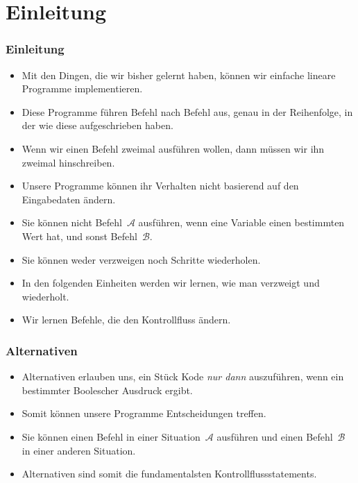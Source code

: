 \documentclass[aspectratio=169,mathserif,notheorems]{beamer}%
\subtitle{22.~Alternativen~mit~if}%
\begin{document}
%
%
\startPresentation%
%
\section{Einleitung}%
\begin{frame}[t]%
\frametitle{Einleitung}%
%
\begin{itemize}%
\item Mit den Dingen, die wir bisher gelernt haben, können wir einfache lineare Programme implementieren.%
\item<2-> Diese Programme führen Befehl nach Befehl aus, genau in der Reihenfolge, in der wie diese aufgeschrieben haben.%
\item<3-> Wenn wir einen Befehl zweimal ausführen wollen, dann müssen wir ihn zweimal hinschreiben.%
\item<4-> Unsere Programme können ihr Verhalten nicht basierend auf den Eingabedaten ändern.%
\item<5-> Sie können nicht Befehl~$\mathcal{A}$ ausführen, wenn eine Variable einen bestimmten Wert hat, und sonst Befehl~$\mathcal{B}$.%
\item<6-> Sie können weder verzweigen noch Schritte wiederholen.%
\item<7-> In den folgenden Einheiten werden wir lernen, wie man verzweigt und wiederholt.%
\item<8-> Wir lernen Befehle, die den Kontrollfluss ändern.%
%
\end{itemize}%
\end{frame}%
%
\begin{frame}%
\frametitle{Alternativen}%
\begin{itemize}%
\item Alternativen erlauben uns, ein Stück Kode \emph{nur dann} auszuführen, wenn ein bestimmter Boolescher Ausdruck  ergibt.%
%
\item<2-> Somit können unsere Programme Entscheidungen treffen.%
%
\item<3-> Sie können einen Befehl in einer Situation~$\mathcal{A}$ ausführen und einen Befehl~$\mathcal{B}$ in einer anderen Situation.%
%
\item<4-> Alternativen sind somit die fundamentalsten Kontrollflussstatements.%
\end{itemize}%
\end{frame}%
%
\end{document}
